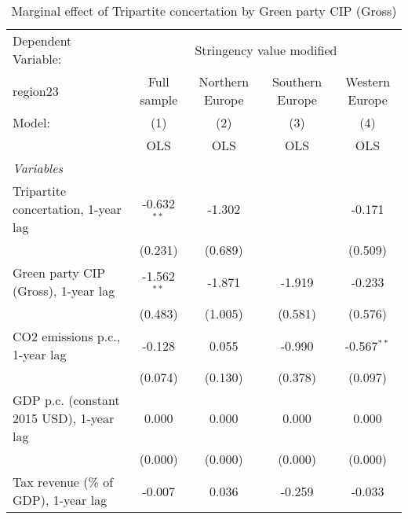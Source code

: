 
\begin{table}[htbp]
   \caption{Marginal effect of Tripartite concertation by Green party CIP (Gross)}
   \centering
   \begin{tabular}{lcccc}
      \toprule
      Dependent Variable: & \multicolumn{4}{c}{Stringency value modified}\\
      region23                                                                  & Full sample   & Northern Europe & Southern Europe & Western Europe \\   
      Model:                                                                    & (1)           & (2)             & (3)             & (4)\\  
                                                                                &  OLS          & OLS             & OLS             & OLS\\  
      \midrule
      \emph{Variables}\\
      Tripartite concertation, 1-year lag                                       & -0.632$^{**}$ & -1.302          &                 & -0.171\\   
                                                                                & (0.231)       & (0.689)         &                 & (0.509)\\   
      Green party CIP (Gross), 1-year lag                                       & -1.562$^{**}$ & -1.871          & -1.919          & -0.233\\   
                                                                                & (0.483)       & (1.005)         & (0.581)         & (0.576)\\   
      CO2 emissions p.c., 1-year lag                                            & -0.128        & 0.055           & -0.990          & -0.567$^{**}$\\   
                                                                                & (0.074)       & (0.130)         & (0.378)         & (0.097)\\   
      GDP p.c. (constant 2015 USD), 1-year lag                                  & 0.000         & 0.000           & 0.000           & 0.000\\   
                                                                                & (0.000)       & (0.000)         & (0.000)         & (0.000)\\   
      Tax revenue (\% of GDP), 1-year lag                                       & -0.007        & 0.036           & -0.259          & -0.033\\   

\end{tabular}
\end{table}
